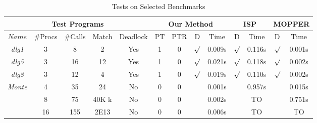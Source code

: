 \begin{savenotes}
\begin{table*}[t]
\begin{center}
\small
\caption{Tests on Selected Benchmarks}\label{table:benchmarks}
     \begin{threeparttable}
\begin{tabular}{|c|c|c|c|c|c|c|c|c|c|c|c|c|}
		\hline
         \multicolumn{5}{|c|}{Test Programs} & \multicolumn{4}{c|}{Our Method} & \multicolumn{2}{c|}{ISP} & \multicolumn{2}{c|}{MOPPER}  \\ \hline
          $Name$ & \#Procs & \#Calls&Match&Deadlock &PT & PTR &D & Time & D &Time & D & Time\\ \hline
           \textit{dlg1} & 3 & 8 & 2  & Yes & 1& 0&$\surd$ & 0.009s & $\surd$ & 0.116s & $\surd$  & 0.001s\\ \hline
          \hline
           \textit{dlg5} & 3 & 16 & 12  & Yes &1&0 & $\surd$ & 0.021s & $\surd$ & 0.118s & $\surd$ & 0.002s\\ \hline
          \hline
           \textit{dlg8} & 3 & 12 & 4 & Yes &1& 0& $\surd$ & 0.019s & $\surd$ & 0.110s & $\surd$ & 0.002s\\ \hline
          \hline
          
          
          \multirow{3}{*}{\textit{Monte}} & 4 & 35 &  24 
          						         & No  &0 &0 &  & 0.001s &  & 0.957s &  & 0.015s\\ \cline{2-13}
						       		& 8 & 75 &  40K k
          						        & No  &0&0 &  & 0.002s &  & TO &  & 0.751s\\ \cline{2-13}
						              & 16 & 155 &  2E13 
          						        & No  &0& 0& & 0.006s &  & TO &  & TO\\ \hline
						       \hline
						       

\end{tabular}
\end{threeparttable}
\end{center}
\end{table*}
\end{savenotes}
